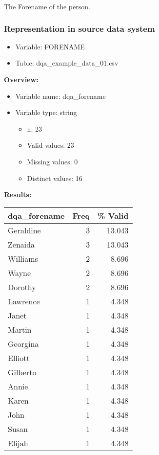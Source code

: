 \documentclass[
]{article}
\providecommand{\tightlist}{%
  \setlength{\itemsep}{0pt}\setlength{\parskip}{0pt}}
\begin{document}
The Forename of the person.

\hypertarget{representation-in-source-data-system-6}{%
\subsubsection{\texorpdfstring{Representation in \textbf{source} data
system}{Representation in source data system}}\label{representation-in-source-data-system-6}}

\begin{itemize}
\tightlist
\item
  Variable: FORENAME
\item
  Table: dqa\_example\_data\_01.csv
\end{itemize}

\textbf{Overview:}

\begin{itemize}
\tightlist
\item
  Variable name: dqa\_forename
\item
  Variable type: string

  \begin{itemize}
  \tightlist
  \item
    n: 23
  \item
    Valid values: 23
  \item
    Missing values: 0
  \item
    Distinct values: 16
  \end{itemize}
\end{itemize}

\textbf{Results:}\\

\begin{table}[H]
\centering
\begin{tabular}{l|r|r}
\hline
\textbf{dqa\_forename} & \textbf{Freq} & \textbf{\% Valid}\\
\hline
Geraldine & 3 & 13.043\\
\hline
Zenaida & 3 & 13.043\\
\hline
Williams & 2 & 8.696\\
\hline
Wayne & 2 & 8.696\\
\hline
Dorothy & 2 & 8.696\\
\hline
Lawrence & 1 & 4.348\\
\hline
Janet & 1 & 4.348\\
\hline
Martin & 1 & 4.348\\
\hline
Georgina & 1 & 4.348\\
\hline
Elliott & 1 & 4.348\\
\hline
Gilberto & 1 & 4.348\\
\hline
Annie & 1 & 4.348\\
\hline
Karen & 1 & 4.348\\
\hline
John & 1 & 4.348\\
\hline
Susan & 1 & 4.348\\
\hline
Elijah & 1 & 4.348\\
\hline
\end{tabular}
\end{table}
\newpage
\end{document}
